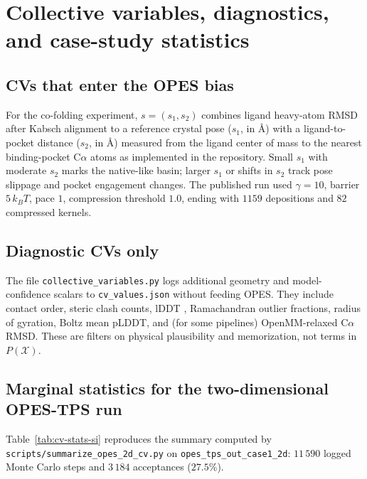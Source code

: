 
\section{Collective variables, diagnostics, and case-study statistics}
\label{sec:cvs-empirical}

\subsection{CVs that enter the OPES bias}

For the co-folding experiment, $s = (s_1, s_2)$ combines ligand heavy-atom RMSD after Kabsch alignment to a reference crystal pose ($s_1$, in \AA) with a ligand-to-pocket distance ($s_2$, in \AA) measured from the ligand center of mass to the nearest binding-pocket C$\alpha$ atoms as implemented in the repository. Small $s_1$ with moderate $s_2$ marks the native-like basin; larger $s_1$ or shifts in $s_2$ track pose slippage and pocket engagement changes. The published run used $\gamma=10$, barrier $5\,k_BT$, pace $1$, compression threshold $1.0$, ending with $1159$ depositions and $82$ compressed kernels.

\subsection{Diagnostic CVs only}

The file \texttt{collective\_variables.py} logs additional geometry and model-confidence scalars to \texttt{cv\_values.json} without feeding OPES. They include contact order, steric clash counts, lDDT \citep{mariani2013lddt}, Ramachandran outlier fractions, radius of gyration, Boltz mean pLDDT, and (for some pipelines) OpenMM-relaxed C$\alpha$ RMSD. These are filters on physical plausibility and memorization, not terms in $P(\mathcal{X})$.

\subsection{Marginal statistics for the two-dimensional OPES-TPS run}

Table~\ref{tab:cv-stats-si} reproduces the summary computed by \texttt{scripts/summarize\_opes\_2d\_cv.py} on \texttt{opes\_tps\_out\_case1\_2d}: $11\,590$ logged Monte Carlo steps and $3\,184$ acceptances ($27.5\%$).

